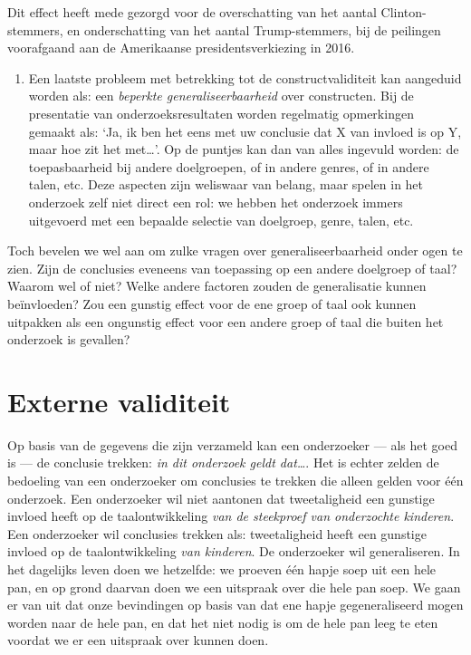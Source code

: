 \documentclass[
]{book}
\providecommand{\tightlist}{%
  \setlength{\itemsep}{0pt}\setlength{\parskip}{0pt}}
\begin{document}
Dit effect heeft mede gezorgd voor de overschatting van het aantal
Clinton-stemmers, en onderschatting van het aantal Trump-stemmers, bij
de peilingen voorafgaand aan de Amerikaanse presidentsverkiezing in
2016.

\begin{enumerate}
\def\labelenumi{\arabic{enumi}.}
\setcounter{enumi}{6}
\tightlist
\item
  Een laatste probleem met betrekking tot de constructvaliditeit kan
  aangeduid worden als: een \emph{beperkte generaliseerbaarheid} over
  constructen. Bij de presentatie van onderzoeksresultaten worden
  regelmatig opmerkingen gemaakt als: `Ja, ik ben het eens met uw
  conclusie dat X van invloed is op Y, maar hoe zit het met\ldots{}'. Op de
  puntjes kan dan van alles ingevuld worden: de toepasbaarheid bij andere
  doelgroepen, of in andere genres, of in andere talen, etc. Deze aspecten
  zijn weliswaar van belang, maar spelen in het onderzoek zelf niet direct
  een rol: we hebben het onderzoek immers uitgevoerd met een bepaalde
  selectie van doelgroep, genre, talen, etc.
\end{enumerate}

Toch bevelen we wel aan om zulke vragen over generaliseerbaarheid onder
ogen te zien. Zijn de conclusies eveneens van toepassing op een andere
doelgroep of taal? Waarom wel of niet? Welke andere factoren zouden de
generalisatie kunnen beïnvloeden? Zou een gunstig effect voor de ene
groep of taal ook kunnen uitpakken als een ongunstig effect voor een
andere groep of taal die buiten het onderzoek is gevallen?

\section{Externe validiteit}\label{sec:externevaliditeit}

Op basis van de gegevens die zijn verzameld kan een onderzoeker --- als
het goed is --- de conclusie trekken: \emph{in dit onderzoek geldt dat\ldots{}}.
Het is echter zelden de bedoeling van een onderzoeker om conclusies te
trekken die alleen gelden voor één onderzoek. Een onderzoeker wil niet
aantonen dat tweetaligheid een gunstige invloed heeft op de
taalontwikkeling \emph{van de steekproef van onderzochte kinderen}. Een
onderzoeker wil conclusies trekken als: tweetaligheid heeft een gunstige
invloed op de taalontwikkeling \emph{van kinderen}. De onderzoeker wil
generaliseren. In het dagelijks leven doen we hetzelfde: we proeven één
hapje soep uit een hele pan, en op grond daarvan doen we een uitspraak
over die hele pan soep. We gaan er van uit dat onze bevindingen op basis
van dat ene hapje gegeneraliseerd mogen worden naar de hele pan, en dat
het niet nodig is om de hele pan leeg te eten voordat we er een
uitspraak over kunnen doen.
\end{document}
